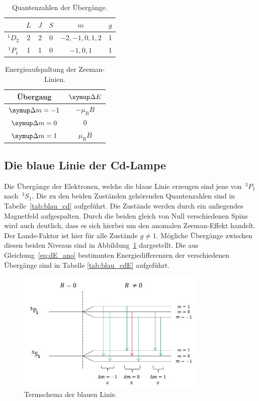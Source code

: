 \begin{table}[H]
    \centering
    \caption{Quantenzahlen der Übergänge.}
    \begin{tabular}{cccccc}
        \toprule
    {} & {$L$}  & {$J$}  & {$S$} & {$m$} & {$g$} \\
		\midrule
	  $^{1}D_2$ & 2 & 2 & 0 & $-2,-1,0,1,2$ & 1 \\
    $^{1}P_1$ & 1 & 1 & 0 & $-1,0,1$ & 1 \\
    \bottomrule
	\end{tabular}
    \label{tab:rot_cd}
\end{table}
%
\begin{table}[H]
    \centering
    \caption{Energieaufspaltung der Zeeman-Linien.}
    \begin{tabular}{cc}
        \toprule
    {Übergang} & {$\upD E$} \\
		\midrule
	  $\upD m=-1$ & $-\mu_{\mathup{B}}B$ \\
    $\upD m=0$ & 0 \\
    $\upD m=1$ & $\mu_{\mathup{B}}B$ \\
    \bottomrule
	\end{tabular}
    \label{tab:rot_cdE}
\end{table}
%
\subsection{Die blaue Linie der Cd-Lampe}
%
Die Übergänge der Elektronen, welche die blaue Linie erzeugen sind jene
von~$^{3}P_1$ nach~$^{3}S_1$. Die zu den beiden Zuständen gehörenden Quantenzahlen
sind in Tabelle~\ref{tab:blau_cd} aufgeführt. Die Zustände werden durch ein
anliegendes Magnetfeld aufgespalten. Durch die beiden gleich von Null verschiedenen
Spins wird auch deutlich, dass es sich hierbei um den anomalen Zeeman-Effekt handelt.
Der Lande-Faktor ist hier für alle Zustände $g\neq1$. Mögliche Übergänge zwischen
diesen beiden Niveaus sind in Abbildung~\ref{fig:therm_blau} dargestellt. Die aus
Gleichung~\eqref{eq:dE_ano} bestimmten Energiedifferenzen der verschiedenen Übergänge
sind in Tabelle \ref{tab:blau_cdE} aufgeführt.

\begin{figure}
    \centering
    \includegraphics[width=0.8\textwidth]{graphics/termschema_blau.jpg}
    \caption{Termschema der blauen Linie.}
    \label{fig:therm_blau}
\end{figure}

